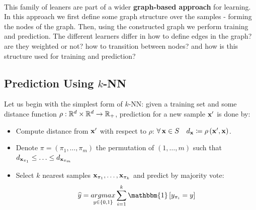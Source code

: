 ~\\This family of leaners are part of a wider \textbf{graph-based approach} for learning. In this approach we first define some graph structure over the samples - forming the nodes of the graph. Then, using the constructed graph we perform training and prediction. The different learners differ in how to define edges in the graph? are they weighted or not? how to transition between nodes? and how is this structure used for training and prediction?

\subsection{Prediction Using $k$-NN}
Let us begin with the simplest form of $k$-NN: given a training set \trainset and some distance function $\rho:\mathbb{R}^d\times\mathbb{R}^d\rightarrow\mathbb{R}_+$, prediction for a new sample $\mathbf{x}'$ is done by:
\begin{itemize}
	\item Compute distance from $\mathbf{x}'$ with respect to $\rho$: $\forall\, \mathbf{x}\in S\quad d_{\mathbf{x}}\coloneqq \rho\left(\mathbf{x}',\mathbf{x}\right)$.
	\item Denote $\pi=\left(\pi_1,\ldots,\pi_m\right)$ the permutation of $\left(1,\ldots,m\right)$ such that $d_{\mathbf{x}_{\pi_{1}}}\leq \ldots \leq d_{\mathbf{x}_{\pi_{m}}}$
	\item Select $k$ nearest samples $\mathbf{x}_{\pi_{1}},\ldots,\mathbf{x}_{\pi_k}$ and predict by majority vote: $$ \widehat{y}=\underset{y\in\left\{0,1\right\}}{argmax}\sum^k_{i=1}\mathbbm{1}\left[y_{\pi_i}=y\right] $$ 
\end{itemize}

